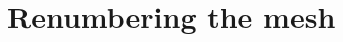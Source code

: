 \documentclass{report}
\begin{document}
% 

% 

% 

% 

% 

\chapter{Renumbering the mesh}


% 

% 

% 


\nocite{*} %


\end{document}
